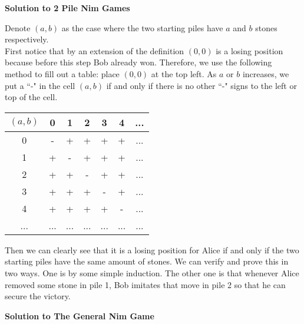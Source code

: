 \noindent
	\textbf{Solution to 2 Pile Nim Games}
	
		\begin{solution}
			Denote $(a,b)$ as the case where the two starting piles have $a$ and $b$ stones respectively.\\
			\indent First notice that by an extension of the definition $(0,0)$ is a losing position because before this step Bob already won. Therefore, we use the following method to fill out a table: place $(0,0)$ at the top left. As $a$ or $b$ increases, we put a ``-" in the cell $(a,b)$ if and only if there is no other ``-" signs to the left or top of the cell.
			\begin{center}
			\begin{tabular}{|c|c|c|c|c|c|c|}
			\hline
			$(a,b)$&0&1&2&3&4&...\\
			\hline
			0&-&+&+&+&+&...\\
			\hline
			1&+&-&+&+&+&...\\
			\hline
			2&+&+&-&+&+&...\\
			\hline
			3&+&+&+&-&+&...\\
			\hline
			4&+&+&+&+&-&...\\
			\hline
			...&...&...&...&...&...&...\\
			\hline
			\end{tabular}
			\end{center}
			
			Then we can clearly see that it is a losing position for Alice if and only if the two starting piles have the same amount of stones. We can verify and prove this in two ways. One is by some simple induction. The other one is that whenever Alice removed some stone in pile 1, Bob imitates that move in pile 2 so that he can secure the victory.
		\end{solution}
		\noindent
	\textbf{Solution to The General Nim Game}
	
